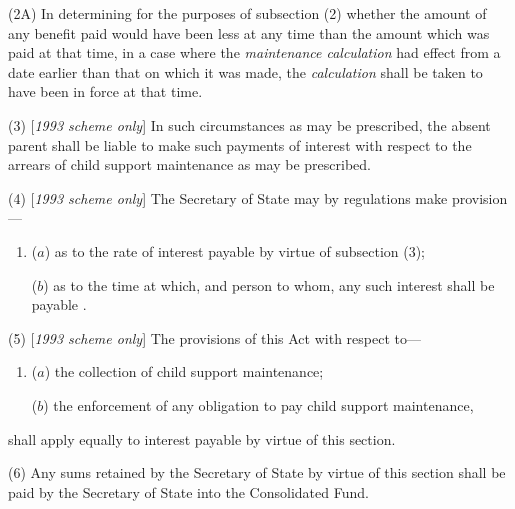 \documentclass[12pt,a4paper]{article}
\begin{document}
(2A) In determining for the purposes of subsection (2) whether the amount of any benefit paid would have been less at any time than the amount which was paid at that time, in a case where the 
\emph{maintenance calculation}  %
had effect from a date earlier than that on which it was made, the 
\emph{calculation}  %
shall be taken to have been in force at that time.

(3) [\emph{1993 scheme only}] In such circumstances as may be prescribed, the absent parent shall be liable to make such payments of interest with respect to the arrears of child support maintenance as may be prescribed.

(4) [\emph{1993 scheme only}] The Secretary of State may by regulations make provision—
\begin{enumerate}\item[]
($a$) as to the rate of interest payable by virtue of subsection (3);

($b$) as to the time at which, and person to whom, any such interest shall be payable%
%
%
.
\end{enumerate}

(5) [\emph{1993 scheme only}] The provisions of this Act with respect to—
\begin{enumerate}\item[]
($a$) the collection of child support maintenance;

($b$) the enforcement of any obligation to pay child support maintenance,
\end{enumerate}
shall apply equally to interest payable by virtue of this section.

(6) Any sums retained by the 
Secretary of State  %
by virtue of this section shall be paid by 
the Secretary of State  %
into the Consolidated Fund.
\end{document}
